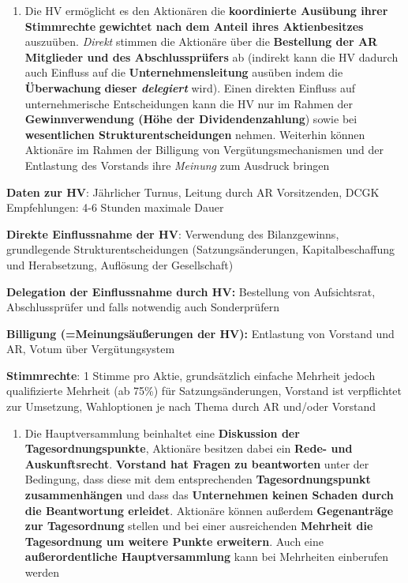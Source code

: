 \documentclass[
]{article}
\providecommand{\tightlist}{%
  \setlength{\itemsep}{0pt}\setlength{\parskip}{0pt}}
\begin{document}
\begin{enumerate}
\def\labelenumi{\arabic{enumi}.}
\tightlist
\item
  Die HV ermöglicht es den Aktionären die \textbf{koordinierte Ausübung
  ihrer Stimmrechte} \textbf{gewichtet nach dem Anteil ihres
  Aktienbesitzes} auszuüben. \emph{Direkt} stimmen die Aktionäre über
  die \textbf{Bestellung der AR Mitglieder und des Abschlussprüfers} ab
  (indirekt kann die HV dadurch auch Einfluss auf die
  \textbf{Unternehmensleitung} ausüben indem die \textbf{Überwachung}
  \textbf{dieser \emph{delegiert}} wird). Einen direkten Einfluss auf
  unternehmerische Entscheidungen kann die HV nur im Rahmen der
  \textbf{Gewinnverwendung (Höhe der Dividendenzahlung}) sowie bei
  \textbf{wesentlichen Strukturentscheidungen} nehmen. Weiterhin können
  Aktionäre im Rahmen der Billigung von Vergütungsmechanismen und der
  Entlastung des Vorstands ihre \emph{Meinung} zum Ausdruck bringen
\end{enumerate}

\textbf{Daten zur HV}: Jährlicher Turnus, Leitung durch AR Vorsitzenden,
DCGK Empfehlungen: 4-6 Stunden maximale Dauer

\textbf{Direkte Einflussnahme der HV}: Verwendung des Bilanzgewinns,
grundlegende Strukturentscheidungen (Satzungsänderungen,
Kapitalbeschaffung und Herabsetzung, Auflösung der Gesellschaft)

\textbf{Delegation der Einflussnahme durch HV: }Bestellung von
Aufsichtsrat, Abschlussprüfer und falls notwendig auch Sonderprüfern

\textbf{Billigung (=Meinungsäußerungen der HV): }Entlastung von Vorstand
und AR, Votum über Vergütungsystem

\textbf{Stimmrechte}: 1 Stimme pro Aktie, grundsätzlich einfache
Mehrheit jedoch qualifizierte Mehrheit (ab 75\%) für Satzungsänderungen,
Vorstand ist verpflichtet zur Umsetzung, Wahloptionen je nach Thema
durch AR und/oder Vorstand

\begin{enumerate}
\def\labelenumi{\arabic{enumi}.}
\tightlist
\item
  Die Hauptversammlung beinhaltet eine \textbf{Diskussion der
  Tagesordnungspunkte}, Aktionäre besitzen dabei ein \textbf{Rede- und
  Auskunftsrecht}. \textbf{Vorstand hat Fragen zu beantworten} unter der
  Bedingung, dass diese mit dem entsprechenden
  \textbf{Tagesordnungspunkt zusammenhängen} und dass das
  \textbf{Unternehmen keinen Schaden durch die Beantwortung erleidet}.
  Aktionäre können außerdem \textbf{Gegenanträge zur Tagesordnung}
  stellen und bei einer ausreichenden \textbf{Mehrheit die Tagesordnung
  um weitere Punkte erweitern}. Auch eine \textbf{außerordentliche
  Hauptversammlung} kann bei Mehrheiten einberufen werden
\end{enumerate}
\end{document}
